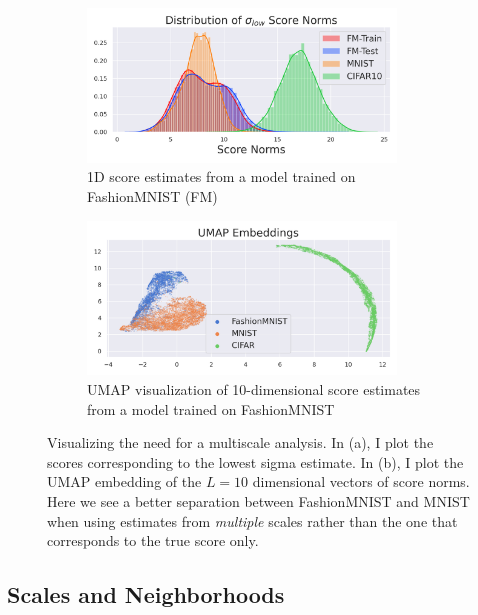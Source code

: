 \begin{figure}[tbhp]
\small
\label{fig:scores}
\centering
\begin{subfigure}[b]{\textwidth}
    \centering
    \includegraphics[width=0.9\textwidth]{figures/low_sigma_FvM_tight.png}
    \caption{1D score estimates from a model trained on FashionMNIST (FM)}
    \label{fig:score_norms}
\end{subfigure}
\hfill
\begin{subfigure}[b]{\textwidth}
    \centering
    \includegraphics[width=0.9\textwidth]{figures/umap_fashion_tight.png}
    \caption{UMAP visualization of 10-dimensional score estimates from a model trained on FashionMNIST}
    \label{fig:umap}
\end{subfigure}

\caption{Visualizing the need for a multiscale analysis. In (a), I plot the scores corresponding to the lowest sigma estimate. In (b), I plot the UMAP embedding of the $L=10$ dimensional vectors of score norms. Here we see a better separation between FashionMNIST and MNIST when using estimates from \textit{multiple} scales rather than the one that corresponds to the true score only.}
\end{figure}


\subsection{Scales and Neighborhoods}
\label{neighborhoods}

